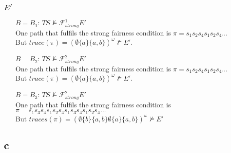 \documentclass[11pt]{article}
\begin{document}
\subsubsection{$E'$}
\begin{itemize}
	\item[$B=B_1$:] $TS \not\models{\mathcal{F}_{strong}^1} E'$\\
	One path that fulfils the strong fairness condition is $\pi = s_1s_2s_4s_1s_2s_4\dots$\\
	But $trace(\pi) = (\emptyset\{a\}\{a,b\})^\omega \not\models E'$.
	\item[$B=B_2$:] $TS \not\models{\mathcal{F}_{strong}^2} E'$\\
	One path that fulfils the strong fairness condition is $\pi = s_1s_2s_4s_1s_2s_4\dots$\\
	But $trace(\pi) = (\emptyset\{a\}\{a,b\})^\omega \not\models E'$.
	\item[$B=B_3$:] $TS \not\models{\mathcal{F}_{strong}^2} E'$\\
	One path that fulfils the strong fairness condition is $\pi= s_1s_3s_4 s_1s_2s_4s_1s_3s_4 s_1s_2s_4 \dots$\\
	But $traces(\pi)=(\emptyset\{b\}\{a,b\}\emptyset\{a\}\{a,b\})^\omega \not\models E'$
\end{itemize}

\subsection{c}

\end{document}
